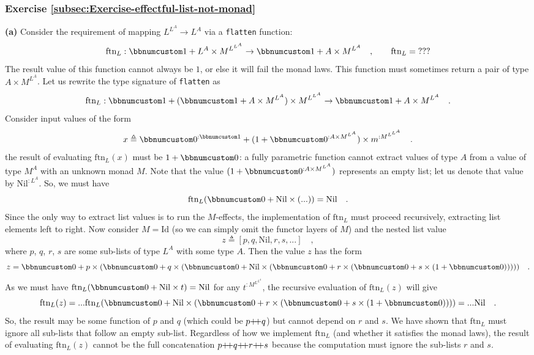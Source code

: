 \subsubsection*{Exercise \ref{subsec:Exercise-effectful-list-not-monad}}

\textbf{(a)} Consider the requirement of mapping $L^{L^{A}}\rightarrow L^{A}$
via a \lstinline!flatten! function:
\[
\text{ftn}_{L}:\bbnum 1+L^{A}\times M^{L^{L^{A}}}\rightarrow\bbnum 1+A\times M^{L^{A}}\quad,\quad\quad\text{ftn}_{L}=\text{???}
\]
The result value of this function cannot always be $1$, or else it
will fail the monad laws. This function must sometimes return a pair
of type $A\times M^{L^{A}}$. Let us rewrite the type signature of
\lstinline!flatten! as
\[
\text{ftn}_{L}:\bbnum 1+(\bbnum 1+A\times M^{L^{A}})\times M^{L^{L^{A}}}\rightarrow\bbnum 1+A\times M^{L^{A}}\quad.
\]
Consider input values of the form 
\[
x\triangleq\bbnum 0^{:\bbnum 1}+(1+\bbnum 0^{:A\times M^{L^{A}}})\times m^{:M^{L^{L^{A}}}}\quad.
\]
the result of evaluating $\text{ftn}_{L}(x)$ must be $1+\bbnum 0$:
a fully parametric function cannot extract values of type $A$ from
a value of type $M^{A}$ with an unknown monad $M$. Note that the
value $(1+\bbnum 0^{:A\times M^{L^{A}}})$ represents an empty list;
let us denote that value by $\text{Nil}^{:L^{A}}$. So, we must have
\[
\text{ftn}_{L}(\bbnum 0+\text{Nil}\times(...))=\text{Nil}\quad.
\]
Since the only way to extract list values is to run the $M$-effects,
the implementation of $\text{ftn}_{L}$ must proceed recursively,
extracting list elements left to right. Now consider $M=\text{Id}$
(so we can simply omit the functor layers of $M$) and the nested
list value
\[
z\triangleq\left[p,q,\text{Nil},r,s,...\right]\quad,
\]
 where $p$, $q$, $r$, $s$ are some sub-lists of type $L^{A}$
with some type $A$. Then the value $z$ has the form
\[
z=\bbnum 0+p\times(\bbnum 0+q\times(\bbnum 0+\text{Nil}\times(\bbnum 0+r\times(\bbnum 0+s\times(1+\bbnum 0)))))\quad.
\]
As we must have $\text{ftn}_{L}(\bbnum 0+\text{Nil}\times t)=\text{Nil}$
for any $t^{:M^{L^{L^{A}}}}$, the recursive evaluation of $\text{ftn}_{L}(z)$
will give
\[
\text{ftn}_{L}(z)=...\text{ftn}_{L}(\bbnum 0+\text{Nil}\times(\bbnum 0+r\times(\bbnum 0+s\times(1+\bbnum 0))))=...\text{Nil}\quad.
\]
So, the result may be some function of $p$ and $q$ (which could
be $p{\displaystyle }{+\negmedspace+} q$) but cannot depend on $r$ and $s$. We have shown
that $\text{ftn}_{L}$ must ignore all sub-lists that follow an empty
sub-list. Regardless of how we implement $\text{ftn}_{L}$ (and whether
it satisfies the monad laws), the result of evaluating $\text{ftn}_{L}(z)$
cannot be the full concatenation $p{\displaystyle }{+\negmedspace+} q{\displaystyle }{+\negmedspace+} r{\displaystyle }{+\negmedspace+} s$ because
the computation must ignore the sub-lists $r$ and $s$.

